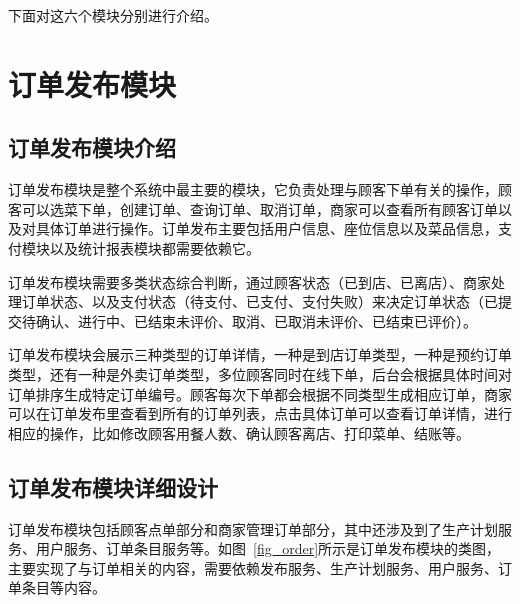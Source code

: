 下面对这六个模块分别进行介绍。

\section{订单发布模块}
\subsection{订单发布模块介绍}
订单发布模块是整个系统中最主要的模块，它负责处理与顾客下单有关的操作，顾客可以选菜下单，创建订单、查询订单、取消订单，商家可以查看所有顾客订单以及对具体订单进行操作。订单发布主要包括用户信息、座位信息以及菜品信息，支付模块以及统计报表模块都需要依赖它。

订单发布模块需要多类状态综合判断，通过顾客状态（已到店、已离店）、商家处理订单状态、以及支付状态（待支付、已支付、支付失败）来决定订单状态（已提交待确认、进行中、已结束未评价、取消、已取消未评价、已结束已评价）。

订单发布模块会展示三种类型的订单详情，一种是到店订单类型，一种是预约订单类型，还有一种是外卖订单类型，多位顾客同时在线下单，后台会根据具体时间对订单排序生成特定订单编号。顾客每次下单都会根据不同类型生成相应订单，商家可以在订单发布里查看到所有的订单列表，点击具体订单可以查看订单详情，进行相应的操作，比如修改顾客用餐人数、确认顾客离店、打印菜单、结账等。\\

\subsection{订单发布模块详细设计}
订单发布模块包括顾客点单部分和商家管理订单部分，其中还涉及到了生产计划服务、用户服务、订单条目服务等。如图~\ref{fig_order}所示是订单发布模块的类图，主要实现了与订单相关的内容，需要依赖发布服务、生产计划服务、用户服务、订单条目等内容。

